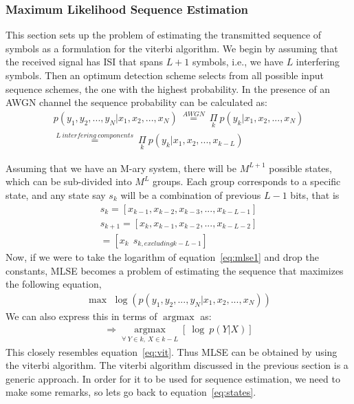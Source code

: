 \documentclass[10pt,journal,compsoc]{IEEEtran} %
\begin{document}
\subsubsection{Maximum Likelihood Sequence Estimation}
This section sets up the problem of estimating the transmitted sequence of symbols as a formulation  for the viterbi algorithm. We begin by assuming that the received signal has ISI that spans $L+1$ symbols, i.e., we have $L$ interfering symbols. Then an optimum detection scheme selects from all possible input sequence schemes, the one with the highest probability. In the presence of an AWGN channel the sequence probability can be calculated as:
\begin{equation}
\begin{align}
p(y_1, y_2,..., y_N| x_1, x_2,...,x_N)~\overset{AWGN}{\operatorname{=}}~\underset{k}{\Pi}~p(y_k| x_1, x_2,...,x_N)\\\overset{L~interfering~components}{\operatorname{=}}~\underset{k}{\Pi}~p(y_k| x_1, x_2,...,x_{k-L})
\end{align}
\label{eq:mlse1}
\end{equation}

Assuming that we have an M-ary system, there will be $M^{L+1}$ possible states, which can be sub-divided into $M^L$ groups. Each group corresponds to a specific state, and any state say $s_k$ will be a combination of previous $L-1$ bits, that is
\begin{equation}
\begin{align}
s_k = [x_{k-1}, x_{k-2}, x_{k-3}, ..., x_{k-L-1}]\\
s_{k+1} = [x_{k}, x_{k-1}, x_{k-2}, ..., x_{k-L-2}]\\
= [x_k~~s_{k,excluding k-L-1}]
\end{align}\label{eq:states}
\end{equation}
Now, if we were to take the logarithm of equation~\ref{eq:mlse1} and drop the constants, MLSE becomes a problem of estimating the sequence that maximizes the following equation,
\begin{equation}
\begin{align}
\operatorname{max~}\operatorname{log}(p(y_1, y_2,..., y_N| x_1, x_2,...,x_N))
\end{align}
\end{equation}
We can also express this in terms of $\operatorname{argmax}$ as:
\begin{equation}
\begin{align}
\Rightarrow \underset{\forall~Y \in k,~X\in k-L}{\operatorname{argmax}}[~\operatorname{log}~p(Y|X)]
\label{eq:mlse2}
\end{align}
\end{equation}
This closely resembles equation~\ref{eq:vit}. Thus MLSE can be obtained by using the viterbi algorithm. The viterbi algorithm discussed in the previous section is a generic approach. In order for it to be used for sequence estimation, we need to make some remarks, so lets go back to equation~\ref{eq:states}. 
\end{document}

